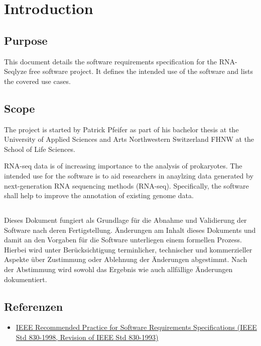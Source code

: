 	\section{Introduction}

\subsection{Purpose}
This document details the software requirements specification for the RNA-Seqlyze free software project. It defines the intended use of the software and lists the covered use cases.

\subsection{Scope}

The project is started by Patrick Pfeifer as part of his bachelor thesis at the University of Applied Sciences and Arts Northwestern 
Switzerland FHNW at the School of Life Sciences.

RNA-seq data is of increasing importance to the analysis of prokaryotes. The intended use for the software is to aid researchers in anaylzing data generated by next-generation RNA sequencing methods (RNA-seq). Specifically, the software shall help to improve the annotation of existing genome data.

\subsection{}

Dieses Dokument fungiert als Grundlage für die Abnahme und Validierung der Software nach deren Fertigstellung. Änderungen am Inhalt dieses Dokuments und damit an den Vorgaben für die Software unterliegen einem formellen Prozess. Hierbei wird unter Berücksichtigung terminlicher, technischer und kommerzieller Aspekte über Zustimmung oder Ablehnung der Änderungen abgestimmt. Nach der Abstimmung wird sowohl das Ergebnis wie auch allfällige Änderungen dokumentiert.


\subsection{Referenzen}
\begin{itemize}
\item \href{http://standards.ieee.org/findstds/standard/830-1998.html}{
	IEEE Recommended Practice for Software Requirements Specifications
	(IEEE Std 830-1998, Revision of IEEE Std 830-1993)}
\end{itemize}

